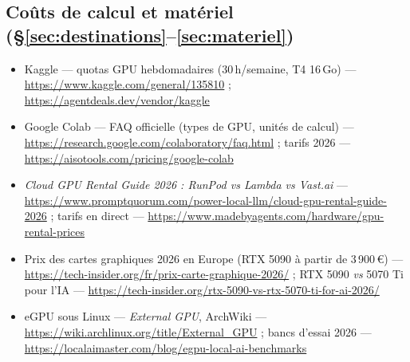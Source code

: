 \documentclass[11pt,a4paper]{article}
\begin{document}
\subsection*{Coûts de calcul et matériel (§\ref{sec:destinations}--\ref{sec:materiel})}

\begin{itemize}[leftmargin=*,itemsep=2pt]
  \item Kaggle — quotas GPU hebdomadaires (30\,h/semaine, T4 16\,Go) —
  \url{https://www.kaggle.com/general/135810} ;
  \url{https://agentdeals.dev/vendor/kaggle}
  \item Google Colab — FAQ officielle (types de GPU, unités de calcul) —
  \url{https://research.google.com/colaboratory/faq.html} ;
  tarifs 2026 — \url{https://aisotools.com/pricing/google-colab}
  \item \emph{Cloud GPU Rental Guide 2026 : RunPod vs Lambda vs Vast.ai} —
  \url{https://www.promptquorum.com/power-local-llm/cloud-gpu-rental-guide-2026} ;
  tarifs en direct — \url{https://www.madebyagents.com/hardware/gpu-rental-prices}
  \item Prix des cartes graphiques 2026 en Europe (RTX 5090 à partir de
  3\,900\,\euro{}) —
  \url{https://tech-insider.org/fr/prix-carte-graphique-2026/} ;
  RTX 5090 \emph{vs} 5070 Ti pour l'IA —
  \url{https://tech-insider.org/rtx-5090-vs-rtx-5070-ti-for-ai-2026/}
  \item eGPU sous Linux — \emph{External GPU}, ArchWiki —
  \url{https://wiki.archlinux.org/title/External_GPU} ;
  bancs d'essai 2026 —
  \url{https://localaimaster.com/blog/egpu-local-ai-benchmarks}
\end{itemize}
\end{document}
